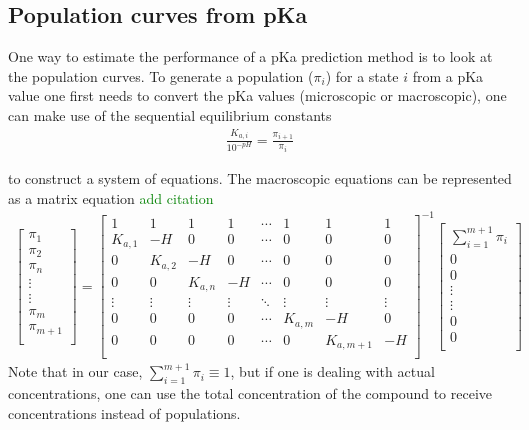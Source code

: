 \documentclass[9pt,lineno,final]{elife}
\begin{document}
 
\subsection{Population curves from pKa}
One way to estimate the performance of a pKa prediction method is to look at the population curves.
%
To generate a population ($\pi_i$) for a state $i$ from a pKa value one first needs to convert the pKa values (microscopic or macroscopic), one can make use of the sequential equilibrium constants 
%
\begin{align}
 \frac{K_{a,i}}{10^{-pH}} = \frac{\pi_{i+1}}{\pi_{i}}
\end{align}

to construct a system of equations. The macroscopic equations can be represented as a matrix equation \textcolor{green}{add citation}
%
\begin{gather}
\begin{bmatrix} \pi_{1} \\ \pi_{2} \\ \pi_{n} \\ \vdots \\ \vdots \\ \pi_{m} \\ \pi_{m+1}\\ \end{bmatrix}
=
\begin{bmatrix}
 1       & 1       & 1       & 1       & \cdots    & 1& 1  & 1 \\
 K_{a,1} & -H      & 0       & 0       & \cdots    & 0&0  & 0 \\
 0       & K_{a,2} & -H      & 0       & \cdots    & 0&0  & 0 \\
 0       & 0       & K_{a,n} & -H      & \cdots    & 0&0  & 0 \\  
 \vdots  & \vdots  & \vdots  & \vdots  & \ddots    & \vdots & \vdots  & \vdots \\
 0       & 0       & 0       & 0       & \cdots    & K_{a,m} & -H & 0 \\  
 0       & 0       & 0       & 0       & \cdots    &         0    & K_{a,m+1}   & -H \\
\end{bmatrix}^{-1}
\begin{bmatrix} \sum_{i=1}^{m+1} \pi_i \\ 0 \\ 0 \\ \vdots \\ \vdots \\ 0 \\ 0\\ \end{bmatrix}
\end{gather}
%
Note that in our case, $\sum\limits_{i=1}^{m+1} \pi_i \equiv 1$, but if one is dealing with actual concentrations, one can use the total concentration of the compound to receive concentrations instead of populations.
\end{document}
